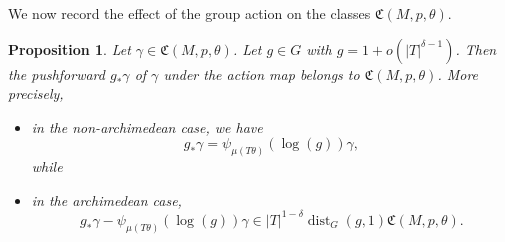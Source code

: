 \documentclass[reqno]{amsart}
\DeclareMathOperator{\dist}{dist}
\theoremstyle{plain} \newtheorem{theorem} {Theorem}
\newtheorem{proposition} [theorem] {Proposition}
\theoremstyle{definition} \newtheorem{definition} [theorem] {Definition}
\theoremstyle{itplain} %
\numberwithin{equation}{section}
\numberwithin{theorem}{section}
\begin{document}
We now record the effect of the group action on the classes $\mathfrak{C}(M,p,\theta)$.
\begin{proposition}\label{lem:sub-gln:let-gamma-in}
  Let $\gamma \in \mathfrak{C}(M,p,\theta)$.  Let $g \in G$ with $g = 1 + o(|T|^{\delta-1})$.  Then the pushforward $g_* \gamma$ of $\gamma$ under the action map belongs to $\mathfrak{C}(M,p,\theta)$.  More precisely,
  \begin{itemize}
  \item in the non-archimedean case, we have
    \begin{equation}\label{eq:g_-gamma-equivariance-non-arch}
      g_* \gamma = \psi_{\mu(T \theta)} (\log (g)) \gamma,
    \end{equation}
    while
  \item in the archimedean case,
\begin{equation*}
  g_* \gamma - \psi_{\mu(T \theta)}(\log(g)) \gamma \in |T|^{1 - \delta} \dist_G(g,1) \mathfrak{C}(M,p,\theta).
\end{equation*}
  \end{itemize}
\end{proposition}
\end{document}
